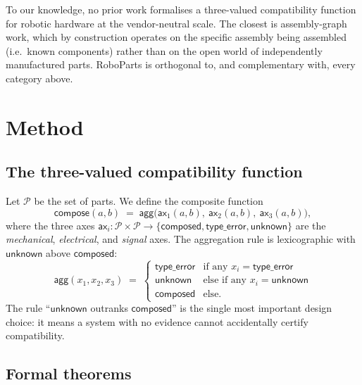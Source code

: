 \documentclass[review]{elsarticle}
\begin{document}
To our knowledge, no prior work formalises a three-valued
compatibility function for robotic hardware at the vendor-neutral
scale. The closest is assembly-graph work, which by construction
operates on the specific assembly being assembled (i.e.\ known
components) rather than on the open world of independently
manufactured parts. RoboParts is orthogonal to, and complementary
with, every category above.

\section{Method}

\subsection{The three-valued compatibility function}

Let $\mathcal{P}$ be the set of parts. We define the composite
function
\begin{equation}
  \mathsf{compose}(a, b) \;=\;
    \mathsf{agg}\!\bigl(\mathsf{ax}_1(a,b),\
    \mathsf{ax}_2(a,b),\ \mathsf{ax}_3(a,b)\bigr),
  \label{eq:compose}
\end{equation}
where the three axes $\mathsf{ax}_i : \mathcal{P}\times\mathcal{P}
\to \{\mathsf{composed}, \mathsf{type\_error}, \mathsf{unknown}\}$
are the \emph{mechanical}, \emph{electrical}, and \emph{signal}
axes. The aggregation rule is lexicographic with $\mathsf{unknown}$
above $\mathsf{composed}$:
\begin{equation}
  \mathsf{agg}(x_1, x_2, x_3) \;=\;
  \begin{cases}
    \mathsf{type\_error} & \text{if any } x_i = \mathsf{type\_error}\\
    \mathsf{unknown}     & \text{else if any } x_i = \mathsf{unknown}\\
    \mathsf{composed}    & \text{else.}
  \end{cases}
  \label{eq:agg}
\end{equation}
The rule ``$\mathsf{unknown}$ outranks $\mathsf{composed}$'' is the
single most important design choice: it means a system with no
evidence cannot accidentally certify compatibility.

\subsection{Formal theorems}
\label{sec:theorems}
\end{document}
